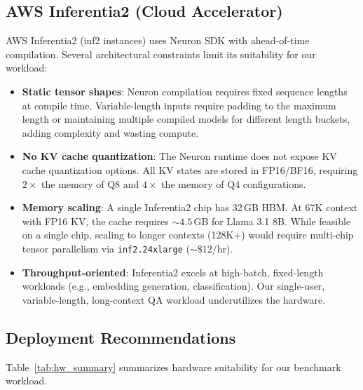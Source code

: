 \documentclass{article}
\begin{document}
\subsection*{AWS Inferentia2 (Cloud Accelerator)}

AWS Inferentia2 (inf2 instances) uses Neuron SDK with ahead-of-time
compilation. Several architectural constraints limit its suitability for our
workload:

\begin{itemize}
\item \textbf{Static tensor shapes}: Neuron compilation requires fixed
  sequence lengths at compile time. Variable-length inputs require padding
  to the maximum length or maintaining multiple compiled models for different
  length buckets, adding complexity and wasting compute.
\item \textbf{No KV cache quantization}: The Neuron runtime does not expose
  KV cache quantization options. All KV states are stored in FP16/BF16,
  requiring $2\times$ the memory of Q8 and $4\times$ the memory of Q4
  configurations.
\item \textbf{Memory scaling}: A single Inferentia2 chip has 32\,GB HBM. At
  67K context with FP16 KV, the cache requires ${\sim}4.5$\,GB for Llama 3.1
  8B. While feasible on a single chip, scaling to longer contexts (128K+)
  would require multi-chip tensor parallelism via \texttt{inf2.24xlarge}
  (${\sim}\$12$/hr).
\item \textbf{Throughput-oriented}: Inferentia2 excels at high-batch,
  fixed-length workloads (e.g., embedding generation, classification). Our
  single-user, variable-length, long-context QA workload underutilizes the
  hardware.
\end{itemize}

\subsection*{Deployment Recommendations}

Table~\ref{tab:hw_summary} summarizes hardware suitability for our benchmark
workload.
\end{document}
